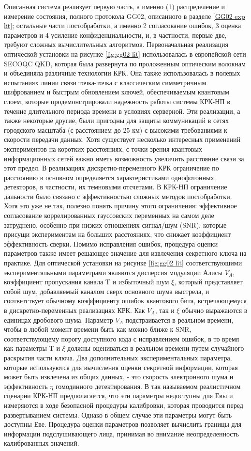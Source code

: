Описанная система реализует первую часть, а именно (1) распределение и измерение состояния, полного протокола GG02, описанного в разделе \ref{GG02 exp lit}; остальные части постобработки, а именно 2 согласование ошибок, 3 оценка параметров и 4 усиление конфиденциальности, и, в частности, первые две, требуют сложных вычислительных алгоритмов. Первоначальная реализация оптической установки на рисунке \ref{fig:gg02 lit} использовалась в европейской сети SECOQC QKD, которая была развернута по проложенным оптическим волокнам и объединяла различные технологии КРК. Она также использовалась в полевых испытаниях линии связи точка-точка с классическим симметричным шифрованием и быстрым обновлением ключей, обеспечиваемым квантовым слоем, которые продемонстрировали надежность работы системы КРК-НП в течение длительного периода времени в условиях серверной. Эти реализации, а также некоторые другие, были пригодны для защиты коммуникаций в сетях городского масштаба (с расстоянием до 25 км) с высокими требованиями к скорости передачи данных. Хотя существует несколько интересных применений экспериментов на коротких расстояниях, с точки зрения квантовых информационных сетей важно иметь возможность увеличить расстояние связи за этот предел. В реализациях дискретно-переменного КРК ограничение по расстоянию в основном определяется характеристиками однофотонных детекторов, в частности, их темновыми отсчетами. В КРК-НП ограничение дальности было связано с эффективностью сложных методов постобработки. Хотя это уже не так, полезно понять причину этого ограничения: эффективное согласование коррелированных гауссовских переменных на самом деле затруднено, особенно при низких отношениях сигнал/шум (SNR), которые присущи экспериментам на больших расстояниях, что снижает коэффициент эффективность сверки. 
Помимо исправления ошибок, процедура оценки параметров также имеет решающее значение для извлечения секретного ключа на практике. Для оптической установки на рисунке \ref{fig:gg02 lit} соответствующими экспериментальными параметрами являются дисперсия модуляции Алисы $V_A$, коэффициент пропускания канала T и избыточный шум $\xi$, который представляет собой шум, добавляемый каналом сверх основного шума выстрела, и соответствует обычному коэффициенту ошибок квантового бита, встречающемуся в дискретно-переменных реализациях КРК. Как $V_A$, так и $\xi$ обычно выражаются в единицах дробового шума. Параметр $V_A$ подстраивается в реальном времени, чтобы в любой момент времени быть как можно ближе к SNR, соответствующему порогу доступного кода с исправлением ошибок, в то время как параметры T и $\xi$ должны оцениваться в реальном времени путем случайного раскрытия части ключа. Два дополнительных экспериментальных параметра, которые используются для вычисления оценки секретной информации, которая может быть извлечена из общих данных, - это скорость электронного шума и эффективность $\eta$ гомодинного детектирования. В так называемом реалистичном сценарии КРК-НП предполагается, что эти параметры недоступны для Евы и измеряются в ходе безопасной процедуры калибровки, которая проводится перед развертыванием системы. Однако в общем случае эти параметры могут быть доступны Еве. Процедура оценки параметров позволяет вычислить границы для информации подслушивающего лица, принимая во внимание неопределенность калиброванных значений.

